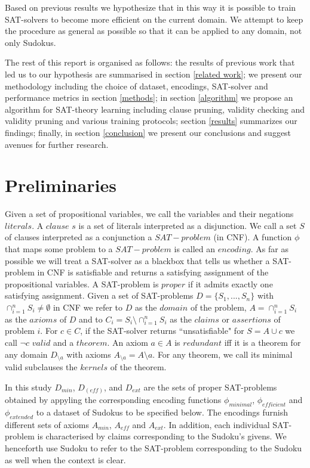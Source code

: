 \documentclass{article}
\begin{document}
Based on previous results we hypothesize that in this way it is possible to train SAT-solvers to become more efficient on the current domain. We attempt to keep the procedure as general as possible so that it can be applied to any domain, not only Sudokus.

The rest of this report is organised as follows: the results of previous work that led us to our hypothesis are summarised in section \ref{related work}; we present our methodology including the choice of dataset, encodings, SAT-solver and performance metrics in section \ref{methods}; in section \ref{algorithm} we propose an algorithm for SAT-theory learning including clause pruning, validity checking and validity pruning and various training protocols; section \ref{results} summarizes our findings; finally, in section \ref{conclusion} we present our conclusions and suggest avenues for further research.

\section{Preliminaries}

Given a set of propositional variables, we call the variables and their negations $literals$. A $clause$ $s$ is a set of literals interpreted as a disjunction. We call a set $S$ of clauses interpreted as a conjunction a $SAT-problem$ (in CNF). A function $\phi$ that maps some problem to a $SAT-problem$ is called an $encoding$. As far as possible we will treat a SAT-solver as a blackbox that tells us whether a SAT-problem in CNF is satisfiable and returns a satisfying assignment of the propositional variables. A SAT-problem is $proper$ if it admits exactly one satisfying assignment. Given a set of SAT-problems $D=\{S_1,...,S_n\}$ with $\cap_{i=1}^n S_i\neq \emptyset$ in CNF we refer to $D$ as the $domain$ of the problem, $A=\cap_{i=1}^n S_i$ as the $axioms$ of $D$ and to  $C_i=S_i\setminus \cap_{i=1}^n S_i$ as the $claims$ or $assertions$ of problem $i$.
For $c\in C$, if the SAT-solver returns ``unsatisfiable" for $S=A\cup c$ we call $\neg c$ $valid$ and a $theorem$. An axiom $a\in A$ is $redundant$ iff it is a theorem for any domain $D_{\setminus a}$ with axioms $A_{\setminus a}=A\setminus a$. For any theorem, we call its minimal valid subclauses the $kernels$ of the theorem.

In this study $D_{min}$, $D_(eff)$, and $D_{ext}$ are the sets of proper SAT-problems obtained by appyling the corresponding encoding functions $\phi_{minimal}$, $\phi_{efficient}$ and $\phi_{extended}$ to a dataset of Sudokus to be specified below. The encodings furnish different sets of axioms $A_{min}$, $A_{eff}$ and $A_{ext}$. In addition, each individual SAT-problem is characterised by claims corresponding to the Sudoku's givens. We henceforth use Sudoku to refer to the SAT-problem corresponding to the Sudoku as well when the context is clear.
\end{document}
